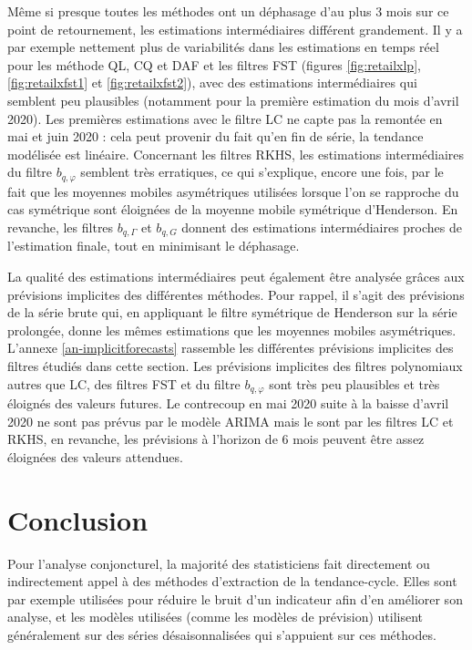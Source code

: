 \documentclass[
  12pt,
  a4paper,french]{article}
\newcommand\1{\mathds{1}}
\begin{document}
Même si presque toutes les méthodes ont un déphasage d'au plus 3 mois sur ce point de retournement, les estimations intermédiaires différent grandement.
Il y a par exemple nettement plus de variabilités dans les estimations en temps réel pour les méthode QL, CQ et DAF et les filtres FST (figures \ref{fig:retailxlp}, \ref{fig:retailxfst1} et \ref{fig:retailxfst2}), avec des estimations intermédiaires qui semblent peu plausibles (notamment pour la première estimation du mois d'avril 2020). Les premières estimations avec le filtre LC ne capte pas la remontée en mai et juin 2020 : cela peut provenir du fait qu'en fin de série, la tendance modélisée est linéaire.
Concernant les filtres RKHS, les estimations intermédiaires du filtre \(b_{q,\varphi}\) semblent très erratiques, ce qui s'explique, encore une fois, par le fait que les moyennes mobiles asymétriques utilisées lorsque l'on se rapproche du cas symétrique sont éloignées de la moyenne mobile symétrique d'Henderson.
En revanche, les filtres \(b_{q,\Gamma}\) et \(b_{q,G}\) donnent des estimations intermédiaires proches de l'estimation finale, tout en minimisant le déphasage.

La qualité des estimations intermédiaires peut également être analysée grâces aux prévisions implicites des différentes méthodes. Pour rappel, il s'agit des prévisions de la série brute qui, en appliquant le filtre symétrique de Henderson sur la série prolongée, donne les mêmes estimations que les moyennes mobiles asymétriques. L'annexe \ref{an-implicitforecasts} rassemble les différentes prévisions implicites des filtres étudiés dans cette section.
Les prévisions implicites des filtres polynomiaux autres que LC, des filtres FST et du filtre \(b_{q,\varphi}\) sont très peu plausibles et très éloignés des valeurs futures.
Le contrecoup en mai 2020 suite à la baisse d'avril 2020 ne sont pas prévus par le modèle ARIMA mais le sont par les filtres LC et RKHS, en revanche, les prévisions à l'horizon de 6 mois peuvent être assez éloignées des valeurs attendues.

\newpage

\hypertarget{conclusion}{%
\section*{Conclusion}\label{conclusion}}

Pour l'analyse conjoncturel, la majorité des statisticiens fait directement ou indirectement appel à des méthodes d'extraction de la tendance-cycle.
Elles sont par exemple utilisées pour réduire le bruit d'un indicateur afin d'en améliorer son analyse, et les modèles utilisées (comme les modèles de prévision) utilisent généralement sur des séries désaisonnalisées qui s'appuient sur ces méthodes.
\end{document}

